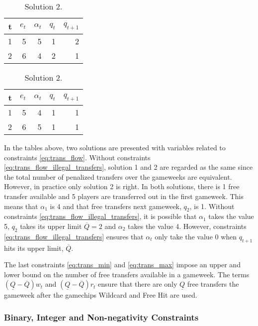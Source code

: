 \begin{table}[H]
\parbox{.45\linewidth}{
\centering
\begin{tabular}{@{}|r|r|r|r|r|@{}}
\hline
t   & $e_{t}$  & $\alpha_{t}$  & $q_{t}$  & $q_{t+1}$   \\
\hline
1  & 5  & 5  & 1  & 2   \\
\hline
2  & 6  & 4  & 2  & 1   \\
\hline
\end{tabular}
\caption*{Solution 1.}
}
\hfill
\parbox{.45\linewidth}{
\centering
\begin{tabular}{@{}|r|r|r|r|r|@{}}
\hline
t   & $e_{t}$  & $\alpha_{t}$  & $q_{t}$  & $q_{t+1}$   \\
\hline
1  & 5  & 4  & 1  & 1   \\
\hline
2  & 6  & 5  & 1  & 1   \\
\hline
\end{tabular}
\caption*{Solution 2.}
}
\end{table}

In the tables above, two solutions are presented with variables related to constraints \eqref{eq:trans_flow}. Without constraints \eqref{eq:trans_flow_illegal_transfers}, solution 1 and 2 are regarded as the same since the total number of penalized transfers over the gameweeks are equivalent. However, in practice only solution 2 is right. In both solutions, there is 1 free transfer available and 5 players are transferred out in the first gameweek. This means that $\alpha_{1}$ is 4 and that free transfers next gameweek, $q_{2}$, is 1. Without constraints \eqref{eq:trans_flow_illegal_transfers}, it is possible that $\alpha_{1}$ takes the value 5, $q_{2}$ takes its upper limit $\overline{Q} = 2$ and $\alpha_{2}$ takes the value 4. However, constraints \eqref{eq:trans_flow_illegal_transfers} ensures that $\alpha_{t}$ only take the value 0 when $q_{t+1}$ hits its upper limit, $\overline{Q}$. 

\newpar

The last constraints \eqref{eq:trans_min} and \eqref{eq:trans_max} impose an upper and lower bound on the number of free transfers available in a gameweek. The terms $(\underline{Q}-\overline{Q})w_{t}$ and $(\underline{Q}-\overline{Q})r_{t}$ ensure that there are only $\underline{Q}$ free transfers the gameweek after the gamechips Wildcard and Free Hit are used. 

\subsubsection{Binary, Integer and Non-negativity Constraints}

